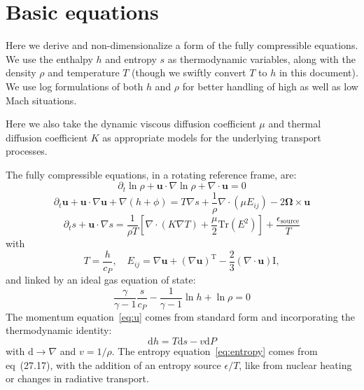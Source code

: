 \documentclass{aastex631}
\newcommand{\del}{\nabla}
\renewcommand{\vec}{\boldsymbol}
\begin{document}
\section{Basic equations}
Here we derive and non-dimensionalize a form of the fully compressible equations.  We use the enthalpy $h$ and entropy $s$ as thermodynamic variables, along with the density $\rho$ and temperature $T$ (though we swiftly convert $T$ to $h$ in this document).  We use log formulations of both $h$ and $\rho$ for better handling of high as well as low Mach situations.

Here we also take the dynamic viscous diffusion coefficient $\mu$ and thermal diffusion coefficient $K$ as appropriate models for the underlying transport processes.

The fully compressible equations, in a rotating reference frame, are:
\begin{equation}
  \partial_t \ln \rho + \vec{u} \cdot \del \ln \rho + \del \cdot \vec{u} = 0
\end{equation}
\begin{equation}
  \partial_t \vec{u} + \vec{u}\cdot \del \vec{u} + \del (h + \phi) = T\del s + \frac{1}{\rho}\del\cdot (\mu E_{ij}) - 2 \vec{\Omega} \times \vec{u}
  \label{eq:u}
\end{equation}
\begin{equation}
  \partial_t s + \vec{u}\cdot \del s = \frac{1}{\rho T}\left[\del \cdot (K \del T) + \frac{\mu}{2}\mathrm{Tr}(E^2)\right] + \frac{\epsilon_\mathrm{source}}{T}
  \label{eq:entropy}
\end{equation}
with
\begin{equation}
  T = \frac{h}{c_P}, \quad E_{ij} = \del \vec{u} + (\del \vec{u})^\mathrm{T} - \frac{2}{3}(\del\cdot\vec{u})\mathrm{I},
\end{equation}
and linked by an ideal gas equation of state:
\begin{equation}
  \frac{\gamma}{\gamma-1} \frac{s}{c_P} - \frac{1}{\gamma - 1}\ln h + \ln \rho =0
\end{equation}
The momentum equation~\ref{eq:u} comes from standard form and incorporating the thermodynamic identity:
\begin{equation}
  \mathrm{d} h = T \mathrm{d} s - v \mathrm{d} P
\end{equation}
with $\mathrm{d} \rightarrow \del$ and $v = 1/\rho$.
The entropy equation~\ref{eq:entropy} comes from \citep{Mihalas&Mihalas} eq~(27.17), with the addition of an entropy source $\epsilon/T$, like from nuclear heating or changes in radiative transport.
\end{document}
